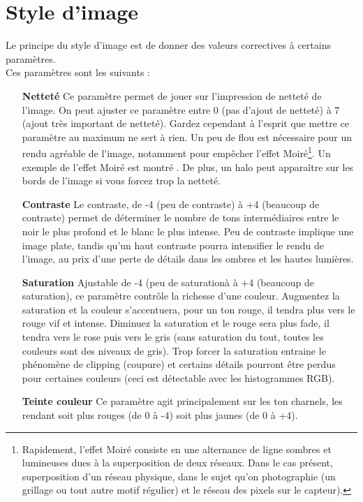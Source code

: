 \documentclass[a4paper,twoside]{article}
\begin{document}
\section{Style d'image}
Le principe du style d'image est de donner des valeurs correctives à certains paramètres. \\
Ces paramètres sont les suivants :
\begin{itemize}
\item[\textbf{Netteté}] Ce paramètre permet de jouer sur l'impression de netteté de l'image. On peut ajuster ce paramètre entre 0 (pas d'ajout de netteté) à 7 (ajout très important de netteté). Gardez cependant à l'esprit que mettre ce paramètre au maximum ne sert à rien. Un peu de flou est nécessaire pour un rendu agréable de l'image, notamment pour empêcher l'effet Moiré\footnote{Rapidement, l'effet Moiré consiste en une alternance de ligne sombres et lumineuses dues à la superposition de deux réseaux. Dans le cas présent, superposition d'un réseau physique, dans le sujet qu'on photographie (un grillage ou tout autre motif régulier) et le réseau des pixels sur le capteur). }. Un exemple de l'effet Moiré est montré . De plus, un halo peut apparaître sur les bords de l'image si vous forcez trop la netteté.
\item[\textbf{Contraste}] Le contraste, de -4 (peu de contraste) à +4 (beaucoup de contraste) permet de déterminer le nombre de tons intermédiaires entre le noir le plus profond et le blanc le plus intense. Peu de contraste implique une image plate, tandis qu'un haut contraste pourra intensifier le rendu de l'image, au prix d'une perte de détails dans les ombres et les hautes lumières.
\item[\textbf{Saturation}] Ajustable de -4 (peu de saturationà à +4 (beaucoup de saturation), ce paramètre contrôle la richesse d'une couleur. Augmentez la saturation et la couleur s'accentuera, pour un ton rouge, il tendra plus vers le rouge vif et intense. Diminuez la saturation et le rouge sera plus fade, il tendra vers le rose puis vers le gris (sans saturation du tout, toutes les couleurs sont des niveaux de gris). Trop forcer la saturation entraine le phénomène de clipping (coupure) et certains détails pourront être perdus pour certaines couleurs (ceci est détectable avec les histogrammes RGB).
\item[\textbf{Teinte couleur}] Ce paramètre agit principalement sur les ton charnels, les rendant soit plus rouges (de 0 à -4) soit plus jaunes (de 0 à +4).
\end{itemize}
\end{document}
